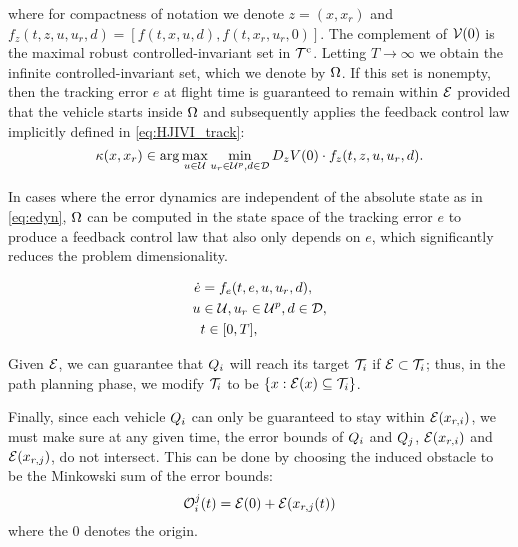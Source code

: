 \noindent where for compactness of notation we denote $z=(x,x_r)$ and $f_z(t,z,u,u_r,d) = [f(t,x,u,d),f(t,x_r,u_r,0)]$. The complement of $\mathcal{V}(0)$ is the maximal robust controlled-invariant set in $\mathcal{T}^\text{c}$. Letting $T\to\infty$ we obtain the infinite controlled-invariant set, which we denote by $\Omega$. If this set is nonempty, then the tracking error $e$ at flight time is guaranteed to remain within $\mathcal{E}$ provided that the vehicle starts inside $\Omega$ and subsequently applies the feedback control law implicitly defined in \eqref{eq:HJIVI_track}:
\begin{equation}\label{eq:robust_tracking_law}
\kappa(x,x_r) \in \arg\max_{u \in \mathcal{U}} \min_{u_r \in\mathcal{U}^p, d \in \mathcal{D}} D_z V(0) \cdot f_z(t,z,u,u_r,d).
\end{equation}

In cases where the error dynamics are independent of the absolute state as in \eqref{eq:edyn}, $\Omega$ can be computed in the state space of the tracking error $e$ to produce a feedback control law that also only depends on $e$, which significantly reduces the problem dimensionality.

\begin{equation}
\label{eq:edyn} %
\begin{aligned}
\dot{e} &= f_e(t, e, u, u_r,d), \\
u &\in \cset, u_r\in\cset^p, d \in \dset, \\
&t \in [0, T],
\end{aligned}
\end{equation}

Given $\mathcal{E}$, we can guarantee that $Q_i$ will reach its target $\mathcal{T}_i$ if $\mathcal{E} \subset \mathcal{T}_i$; thus, in the path planning phase, we modify $\mathcal{T}_i$ to be $\{x: \mathcal{E}(x) \subseteq \mathcal{T}_i\}$.

Finally, since each vehicle $Q_i$ can only be guaranteed to stay within $\mathcal{E}(x_{r,i})$, we must make sure at any given time, the error bounds of $Q_i$ and $Q_j$, $\mathcal{E}(x_{r,i})$ and $\mathcal{E}(x_{r,j})$, do not intersect. This can be done by choosing the induced obstacle to be the Minkowski sum of the error bounds:
\begin{equation}
\mathcal{O}_i^j(t) = \mathcal{E}(0) + \mathcal{E}(x_{r,j}(t))
\end{equation}
\noindent where the $0$ denotes the origin.


